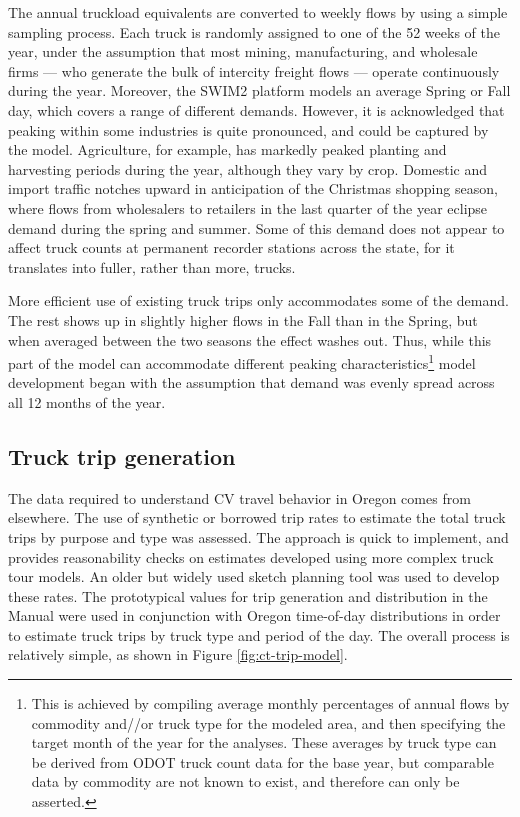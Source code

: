 The annual truckload equivalents are converted to weekly flows by using a simple sampling process. Each truck is randomly assigned to one of the 52 weeks of the year, under the assumption that most mining, manufacturing, and wholesale firms --- who generate the bulk of intercity freight flows --- operate continuously during the year. Moreover, the SWIM2 platform models an average Spring or Fall day, which covers a range of different demands. However, it is acknowledged that peaking within some industries is quite pronounced, and could be captured by the model. Agriculture, for example, has markedly peaked planting and harvesting periods during the year, although they vary by crop. Domestic and import traffic notches upward in anticipation of the Christmas shopping season, where flows from wholesalers to retailers in the last quarter of the year eclipse demand during the spring and summer. Some of this demand does not appear to affect truck counts at permanent recorder stations across the state, for it translates into fuller, rather than more, trucks.

More efficient use of existing truck trips only accommodates some of the demand. The rest shows up in slightly higher flows in the Fall than in the Spring, but when averaged between the two seasons the effect washes out. Thus, while this part of the model can accommodate different peaking characteristics\footnote{This is achieved by compiling average monthly percentages of annual flows by commodity and//or truck type for the modeled area, and then specifying the target month of the year for the analyses. These averages by truck type can be derived from ODOT truck count data for the base year, but comparable data by commodity are not known to exist, and therefore can only be asserted.} model development began with the assumption that demand was evenly spread across all 12 months of the year.

\subsection{Truck trip generation}
The data required to understand CV travel behavior in Oregon comes from elsewhere. The use of synthetic or borrowed trip rates to estimate the total truck trips by purpose and type was assessed. The approach is quick to implement, and provides reasonability checks on estimates developed using more complex truck tour models. An older but widely used sketch planning tool \citep{beagan07} was used to develop these rates. The prototypical values for trip generation and distribution in the Manual were used in conjunction with Oregon time-of-day distributions in order to estimate truck trips by truck type and period of the day. The overall process is relatively simple, as shown in Figure \ref{fig:ct-trip-model}.

